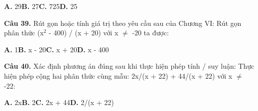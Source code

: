 \documentclass[11pt,a4paper]{article}
\begin{document}
\hspace*{1.5em}\textbf{A.} 29\quad\quad \textbf{B.} 27\quad\quad \textbf{C.} 725\quad\quad \textbf{D.} 25\par\vspace{2pt}
\textbf{\color{primary} Câu 39.} Rút gọn hoặc tính giá trị theo yêu cầu sau của Chương VI: Rút gọn phân thức (x$^2$ - 400) / (x + 20) với x $\ne$ -20 ta được:\par
\hspace*{1.5em}\textbf{A.} 1\quad\quad \textbf{B.} x - 20\quad\quad \textbf{C.} x + 20\quad\quad \textbf{D.} x - 400\par\vspace{2pt}
\textbf{\color{primary} Câu 40.} Xác định phương án đúng sau khi thực hiện phép tính / suy luận: Thực hiện phép cộng hai phân thức cùng mẫu: 2x/(x + 22) + 44/(x + 22) với x $\ne$ -22:\par
\hspace*{1.5em}\textbf{A.} 2x\quad\quad \textbf{B.} 2\quad\quad \textbf{C.} 2x + 44\quad\quad \textbf{D.} 2/(x + 22)\par\vspace{2pt}
\end{document}
